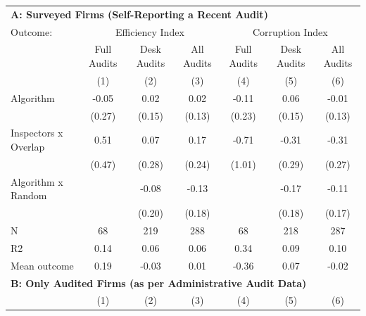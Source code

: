 \begin{tabular}{lccc|ccc} \toprule
\multicolumn{7}{l}{\textbf{A: Surveyed Firms (Self-Reporting a Recent Audit)}} \\ \multicolumn{1}{l}{Outcome:} & \multicolumn{3}{c}{Efficiency Index} & \multicolumn{3}{c}{Corruption Index} \\ \multicolumn{1}{l}{} & Full Audits & Desk Audits & All Audits & Full Audits & Desk Audits & All Audits \\ \multicolumn{1}{l}{} & (1) & (2) & (3) & (4) & (5) & (6) \\ \midrule
Algorithm   &       -0.05         &        0.02         &        0.02         &       -0.11         &        0.06         &       -0.01         \\
            &      (0.27)         &      (0.15)         &      (0.13)         &      (0.23)         &      (0.15)         &      (0.13)         \\
\addlinespace
Inspectors x Overlap&        0.51         &        0.07         &        0.17         &       -0.71         &       -0.31         &       -0.31         \\
            &      (0.47)         &      (0.28)         &      (0.24)         &      (1.01)         &      (0.29)         &      (0.27)         \\
\addlinespace
Algorithm x Random&                     &       -0.08         &       -0.13         &                     &       -0.17         &       -0.11         \\
            &                     &      (0.20)         &      (0.18)         &                     &      (0.18)         &      (0.17)         \\
\midrule
N           &          68         &         219         &         288         &          68         &         218         &         287         \\
R2          &        0.14         &        0.06         &        0.06         &        0.34         &        0.09         &        0.10         \\
Mean outcome&        0.19         &       -0.03         &        0.01         &       -0.36         &        0.07         &       -0.02         \\

\midrule \multicolumn{7}{l}{\textbf{B: Only Audited Firms (as per Administrative Audit Data)}} \\ \multicolumn{1}{l}{} & (1) & (2) & (3) & (4) & (5) & (6) \\ \midrule


\end{tabular}
